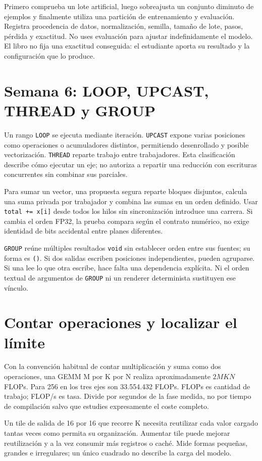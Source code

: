 \documentclass[12pt,a4paper,oneside]{report}
\begin{document}
Primero comprueba un lote artificial, luego sobreajusta un conjunto diminuto de ejemplos y finalmente utiliza una partición de entrenamiento y evaluación. Registra procedencia de datos, normalización, semilla, tamaño de lote, pasos, pérdida y exactitud. No uses evaluación para ajustar indefinidamente el modelo. El libro no fija una exactitud conseguida: el estudiante aporta su resultado y la configuración que lo produce.

\section{Semana 6: LOOP, UPCAST, THREAD y GROUP}
Un rango \texttt{LOOP} se ejecuta mediante iteración. \texttt{UPCAST} expone varias posiciones como operaciones o acumuladores distintos, permitiendo desenrollado y posible vectorización. \texttt{THREAD} reparte trabajo entre trabajadores. Esta clasificación describe cómo ejecutar un eje; no autoriza a repartir una reducción con escrituras concurrentes sin combinar sus parciales.

Para sumar un vector, una propuesta segura reparte bloques disjuntos, calcula una suma privada por trabajador y combina las sumas en un orden definido. Usar \texttt{total += x[i]} desde todos los hilos sin sincronización introduce una carrera. Si cambia el orden FP32, la prueba compara según el contrato numérico, no exige identidad de bits accidental entre planes diferentes.

\texttt{GROUP} reúne múltiples resultados \texttt{void} sin establecer orden entre sus fuentes; su forma es \texttt{()}. Si dos salidas escriben posiciones independientes, pueden agruparse. Si una lee lo que otra escribe, hace falta una dependencia explícita. Ni el orden textual de argumentos de \texttt{GROUP} ni un renderer determinista sustituyen ese vínculo.

\section{Contar operaciones y localizar el límite}
Con la convención habitual de contar multiplicación y suma como dos operaciones, una GEMM M por K por N realiza aproximadamente $2MKN$ FLOPs. Para 256 en los tres ejes son 33.554.432 FLOPs. FLOPs es cantidad de trabajo; FLOP/s es tasa. Divide por segundos de la fase medida, no por tiempo de compilación salvo que estudies expresamente el coste completo.

Un tile de salida de 16 por 16 que recorre K necesita reutilizar cada valor cargado tantas veces como permita su organización. Aumentar tile puede mejorar reutilización y a la vez consumir más registros o caché. Mide formas pequeñas, grandes e irregulares; un único cuadrado no describe la carga del modelo.
\end{document}
